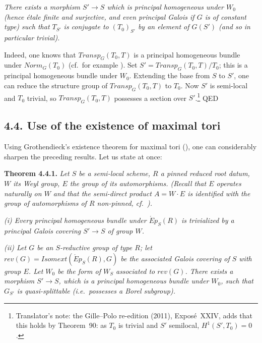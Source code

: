 \emph{There exists a morphism \(S' \to S\) which is principal homogeneous under \(W_0\) (hence étale finite and surjective, and
even principal Galois if \(G\) is of constant type) such that \(T_{S'}\) is conjugate to \((T_{0})_{S'}\) by an element of
\(G(S')\) (and so in particular trivial).}

Indeed, one knows that \(Transp_{G}(T_{0}, T)\) is a principal homogeneous bundle under \(Norm_{G}(T_{0})\) (cf.~for example
). Set \(S' = Transp_{G}(T_{0}, T) / T_{0}\); this is a principal homogeneous bundle under \(W_0\).
Extending the base from \(S\) to \(S'\), one can reduce the structure group of \(Transp_{G}(T_{0}, T)\) to \(T_0\). Now \(S'\) is
semi-local and \(T_0\) trivial, so \(Transp_{G}(T_{0}, T)\) possesses a section over \(S'\).\footnote{Translator's note: the Gille--Polo re-edition (2011), Exposé~XXIV,
adds that this holds by Theorem~90: as \(T_0\) is trivial and \(S'\) semilocal,
\(H^1(S',T_0)=0\).} QED

\subsection*{4.4. Use of the existence of maximal tori}

Using Grothendieck's existence theorem for maximal tori (), one can considerably sharpen the preceding
results. Let us state at once:

\textbf{Theorem 4.4.1.} \emph{Let \(S\) be a semi-local scheme, \(R\) a pinned reduced root datum, \(W\) its Weyl group, \(E\) the group
of its automorphisms. (Recall that \(E\) operates naturally on \(W\) and that the semi-direct product \(A = W \cdot E\) is
identified with the group of automorphisms of \(R\) non-pinned, cf.~).}

\emph{(i) Every principal homogeneous bundle under \(\acute{E}p_{S}(R)\) is trivialized by a principal Galois covering \(S' \to
S\) of group \(W\).}

\emph{(ii) Let \(G\) be an \(S\)-reductive group of type \(R\); let \(rev(G) = Isomext(\acute{E}p_{S}(R), G)\) be the associated
Galois covering of \(S\) with group \(E\). Let \(W_0\) be the form of \(W_S\) associated to \(rev(G)\). There exists a morphism
\(S' \to S\), which is a principal homogeneous bundle under \(W_0\), such that \(G_{S'}\) is quasi-splittable (i.e.~possesses
a Borel subgroup).}

